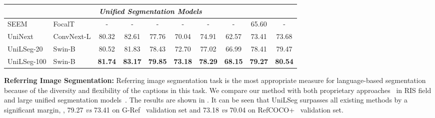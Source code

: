 \documentclass[10pt,twocolumn,letterpaper]{article}
\newcommand{\MethodName}{UniLSeg\xspace}
\begin{document}
\begin{table*}[ht]
{\begin{tabular}{l|l|c|c|c|c|c|c|c|c}
\hline
      \multicolumn{10}{c}{\textit{Unified Segmentation Models}}   \\
      \hline
      SEEM~\cite{seem} & FocalT & - & - & - & - & - & - & 65.60 & - \\
      UniNext~\cite{uninext} &ConvNext-L & 80.32 & 82.61 & 77.76 & 70.04 & 74.91 & 62.57 & 73.41 & 73.68  \\
\hline
      \MethodName-20 & Swin-B &80.52 & 81.83 &78.43 &72.70 &77.02 &66.99 &78.41 &79.47  \\
      \MethodName-100 & Swin-B &\textbf{81.74} & \textbf{83.17} &\textbf{79.85} &\textbf{73.18} & \textbf{78.29} & \textbf{68.15} &\textbf{79.27} & \textbf{80.54}  \\
\hline
   \end{tabular}}
   
\label{table:ris}
\end{table*} \vspace{5pt}
\noindent \textbf{Referring Image Segmentation:}
Referring image segmentation task is the most appropriate measure for language-based segmentation because of the diversity and flexibility of the captions in this task. We compare our method with both proprietary approaches~\cite{lavt, cris, gres, polyformer} in RIS field and large unified segmentation models~\cite{seem, uninext}. The results are shown in . It can be seen that \MethodName surpasses all existing methods by a significant margin, \eg, 79.27 \textit{vs} 73.41 on G-Ref~\cite{grefcoco} validation set and 73.18 \textit{vs} 70.04 on RefCOCO+~\cite{refcoco} validation set.
\end{document}
